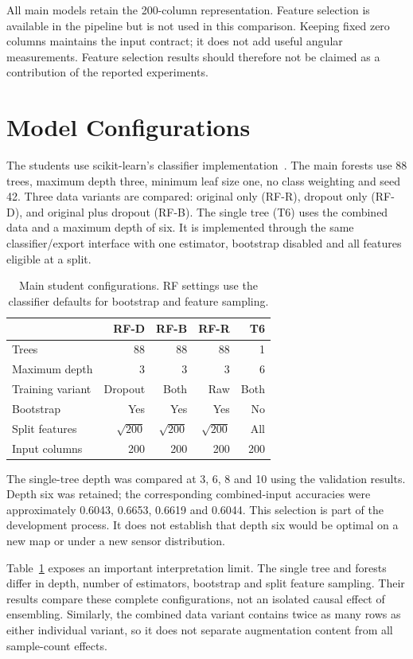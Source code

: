 All main models retain the 200-column representation. Feature selection is
available in the pipeline but is not used in this comparison. Keeping fixed
zero columns maintains the input contract; it does not add useful angular
measurements. Feature selection results should therefore not be claimed as
a contribution of the reported experiments.

\section{Model Configurations}
The students use scikit-learn's classifier implementation~\cite{pedregosa2011sklearn,sklearnForest}.
The main forests use 88 trees, maximum depth three, minimum leaf size one,
no class weighting and seed 42. Three data variants are compared: original
only (RF-R), dropout only (RF-D), and original plus dropout (RF-B). The single
tree (T6) uses the combined data and a maximum depth of six. It is implemented
through the same classifier/export interface with one estimator, bootstrap
disabled and all features eligible at a split.

\begin{table}[htbp]
\centering\small
\caption[Student model configurations]{Main student configurations. RF settings use the classifier defaults
for bootstrap and feature sampling.}
\label{tab:models}
\begin{tabular}{lrrrr}
\toprule & RF-D & RF-B & RF-R & T6 \\\midrule
Trees & 88 & 88 & 88 & 1 \\
Maximum depth & 3 & 3 & 3 & 6 \\
Training variant & Dropout & Both & Raw & Both \\
Bootstrap & Yes & Yes & Yes & No \\
Split features & $\sqrt{200}$ & $\sqrt{200}$ & $\sqrt{200}$ & All \\
Input columns & 200 & 200 & 200 & 200 \\
\bottomrule
\end{tabular}
\end{table}

The single-tree depth was compared at 3, 6, 8 and 10 using the validation
results. Depth six was retained; the corresponding combined-input accuracies
were approximately 0.6043, 0.6653, 0.6619 and 0.6044. This selection is part of
the development process. It does not establish that depth six would be optimal
on a new map or under a new sensor distribution.

Table~\ref{tab:models} exposes an important interpretation limit. The single
tree and forests differ in depth, number of estimators, bootstrap and split
feature sampling. Their results compare these complete configurations, not an
isolated causal effect of ensembling. Similarly, the combined data variant
contains twice as many rows as either individual variant, so it does not
separate augmentation content from all sample-count effects.

